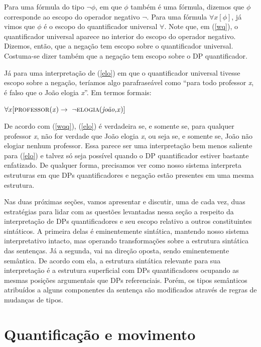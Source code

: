 \n Para uma fórmula do tipo $\neg\phi$, em que $\phi$ também é uma
fórmula, dizemos que $\phi$ corresponde ao escopo do operador
negativo $\neg$. Para uma fórmula $\forall x [\phi]$, já vimos que $\phi$ é o escopo do quantificador universal $\forall$. Note que, em (\ref{wq}), o quantificador universal aparece no interior do
escopo do operador negativo. Dizemos, então, que a negação tem
escopo sobre o quantificador universal. Costuma-se dizer também que a negação tem escopo sobre o DP quantificador.

Já para uma interpretação de (\ref{elo}) em que o quantificador universal tivesse escopo sobre a negação, teríamos algo parafraseável como ``para todo professor \textit{x}, é falso que o João elogia \textit{x}''. Em termos formais:

\begin{exe}
    \ex $\forall x [\text{\textsc{professor}(\textit{x})} \rightarrow\ \neg\text{\textsc{elogia}(\textit{joão,x})}]$ \label{wqq}
\end{exe}


\n De acordo com (\ref{wqq}), (\ref{elo}) é verdadeira se, e somente se, para qualquer professor \textit{x}, não for verdade que João elogia \textit{x}, ou seja se, e somente se, João não elogiar nenhum professor. Essa parece ser uma interpretação bem menos saliente para (\ref{elo}) e talvez só seja possível quando o DP quantificador estiver bastante enfatizado. De qualquer forma, precisamos ver como nosso sistema interpreta estruturas em que DPs quantificadores e negação estão presentes em uma mesma estrutura.

Nas duas próximas seções, vamos apresentar e discutir, uma de cada vez, duas estratégias para lidar com as questões levantadas nessa seção a respeito da interpretação de DPs quantificadores e seu escopo relativo a outros constituintes sintáticos. A primeira delas é eminentemente sintática, mantendo nosso sistema interpretativo
intacto, mas operando transformações sobre a estrutura sintática das sentenças. Já a segunda, vai na direção oposta,
sendo eminentemente semântica. De acordo com ela, a estrutura
sintática relevante para sua interpretação é a estrutura superficial com DPs quantificadores ocupando as mesmas posições argumentais que DPs referenciais. Porém, os tipos semânticos atribuídos a alguns componentes
da sentença são modificados através de regras de mudanças de tipos. 

\section{Quantificação e movimento}

